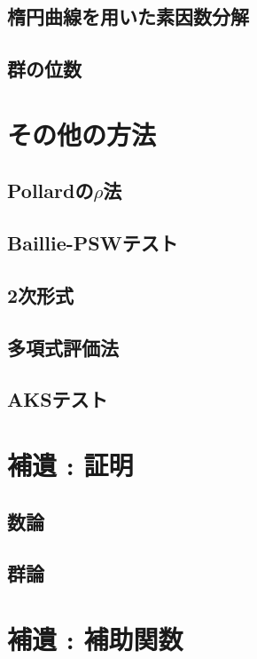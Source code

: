 \subsection{楕円曲線を用いた素因数分解}

\subsection{群の位数}


\section{その他の方法}
\subsection{Pollardの$\rho$法}

\subsection{Baillie-PSWテスト}

\subsection{2次形式}

\subsection{多項式評価法}

\subsection{AKSテスト}


\section{補遺 : 証明}
\subsection{数論}

\subsection{群論}


\section{補遺 : 補助関数}


\newpage
\printindex



